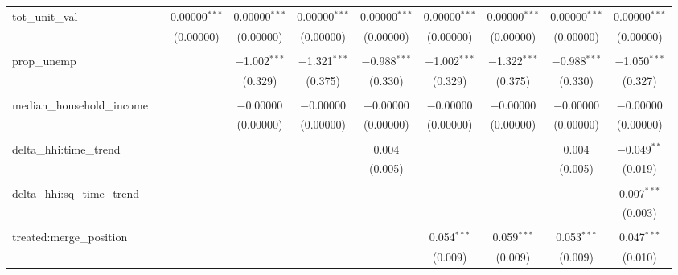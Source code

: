 \begin{table}[H]
{\begin{tabular}{@{\extracolsep{5pt}}lccccccccc}
  tot\_unit\_val &  & 0.00000$^{***}$ & 0.00000$^{***}$ & 0.00000$^{***}$ & 0.00000$^{***}$ & 0.00000$^{***}$ & 0.00000$^{***}$ & 0.00000$^{***}$ & 0.00000$^{***}$ \\  

   &  & (0.00000) & (0.00000) & (0.00000) & (0.00000) & (0.00000) & (0.00000) & (0.00000) & (0.00000) \\  

   & & & & & & & & & \\  

  prop\_unemp &  &  & $-$1.002$^{***}$ & $-$1.321$^{***}$ & $-$0.988$^{***}$ & $-$1.002$^{***}$ & $-$1.322$^{***}$ & $-$0.988$^{***}$ & $-$1.050$^{***}$ \\  

   &  &  & (0.329) & (0.375) & (0.330) & (0.329) & (0.375) & (0.330) & (0.327) \\  

   & & & & & & & & & \\  

  median\_household\_income &  &  & $-$0.00000 & $-$0.00000 & $-$0.00000 & $-$0.00000 & $-$0.00000 & $-$0.00000 & $-$0.00000 \\  

   &  &  & (0.00000) & (0.00000) & (0.00000) & (0.00000) & (0.00000) & (0.00000) & (0.00000) \\  

   & & & & & & & & & \\  

  delta\_hhi:time\_trend &  &  &  &  & 0.004 &  &  & 0.004 & $-$0.049$^{**}$ \\  

   &  &  &  &  & (0.005) &  &  & (0.005) & (0.019) \\  

   & & & & & & & & & \\  

  delta\_hhi:sq\_time\_trend &  &  &  &  &  &  &  &  & 0.007$^{***}$ \\  

   &  &  &  &  &  &  &  &  & (0.003) \\  

   & & & & & & & & & \\  

  treated:merge\_position &  &  &  &  &  & 0.054$^{***}$ & 0.059$^{***}$ & 0.053$^{***}$ & 0.047$^{***}$ \\  

   &  &  &  &  &  & (0.009) & (0.009) & (0.009) & (0.010) \\  


\end{tabular}}
\end{table}
